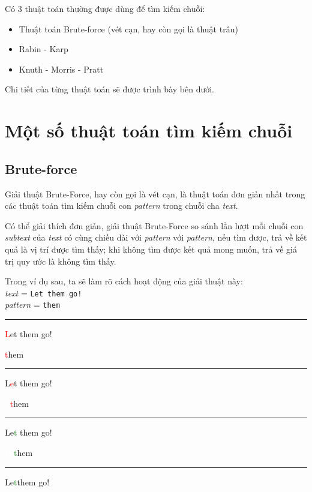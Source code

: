 \documentclass[a4paper,11pt]{article}
\begin{document}
\vspace*{3mm}
Có 3 thuật toán thường được dùng để tìm kiếm chuỗi:
\begin{itemize}
	\item Thuật toán Brute-force (vét cạn, hay còn gọi là thuật trâu)
	\item Rabin - Karp
	\item Knuth - Morris - Pratt
\end{itemize}
Chi tiết của từng thuật toán sẽ được trình bày bên dưới.

\section{Một số thuật toán tìm kiếm chuỗi}

	\subsection {Brute-force} 
			Giải thuật Brute-Force, hay còn gọi là vét cạn, 
		là thuật toán đơn giản nhất trong các thuật toán 
		tìm kiếm chuỗi con \textit{pattern} 
		trong chuỗi cha \textit{text}.

		Có thể giải thích đơn giản, giải thuật Brute-Force 
		so sánh lần lượt mỗi chuỗi con \textit{subtext} của \textit{text} 
		có cùng chiều dài với \textit{pattern} với \textit{pattern}, 
		nếu tìm được, trả về kết quả là vị trí được tìm thấy; khi không 
		tìm được kết quả mong muốn, trả về giá trị quy ước là không tìm thấy.

		Trong ví dụ sau, ta sẽ làm rõ cách hoạt động của giải thuật này:\\
		\textit{text} \hspace*{7mm}= \verb|Let them go!| \\
		\textit{pattern} \hspace*{0.1mm} = \verb|them| 
		\vspace*{4mm}
		\hrule
		\textcolor{red}{L}et them go!\
		
		\textcolor{red}{t}hem

		\vspace*{2mm}
		\hrule
		L\textcolor{red}{e}t them go!
		
		\textcolor{white}{L}\textcolor{red}{t}hem
		
		\vspace*{2mm}
		\hrule
		Le\textcolor{ForestGreen}{t} them go!
		
		\textcolor{white}{Le}\textcolor{ForestGreen}{t}hem
		
		\vspace*{2mm}
		\hrule
		Le\textcolor{ForestGreen}{t}\textcolor{red}{\textvisiblespace}them go!
		
\end{document}
